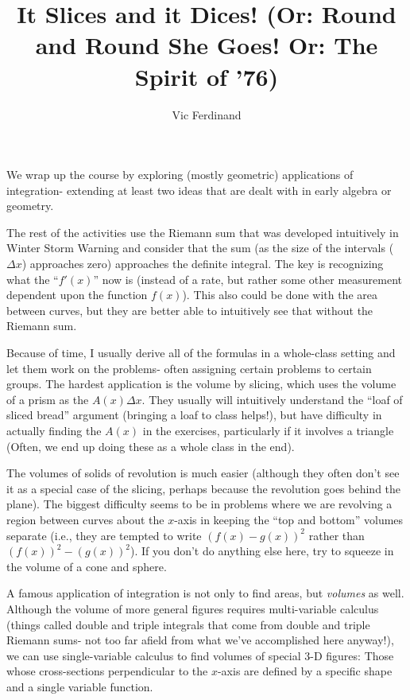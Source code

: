 \documentclass{ximera}
\author{Vic Ferdinand}
\title{It Slices and it Dices! (Or: Round and Round She Goes! Or: The Spirit of '76)}
\begin{document}
\begin{abstract}
\end{abstract}
\maketitle

\begin{instructorIntro}
We wrap up the course by exploring (mostly geometric) applications of integration- extending at least two ideas that are dealt with in early algebra or geometry.  

The rest of the activities use the Riemann sum that was developed intuitively in Winter Storm Warning and consider that the sum (as the size of the intervals ($\Delta x$) approaches zero) approaches the definite integral.  The key is recognizing what the ``$f'(x)$'' now is (instead of a rate, but rather some other measurement dependent upon the function $f(x)$).  This also could be done with the area between curves, but they are better able to intuitively see that without the Riemann sum. 

Because of time, I usually derive all of the formulas in a whole-class setting and let them work on the problems- often assigning certain problems to certain groups. The hardest application is the volume by slicing, which uses the volume of a prism as the $A(x) \Delta x$.  They usually will intuitively understand the ``loaf of sliced bread'' argument (bringing a loaf to class helps!), but have difficulty in actually finding the $A(x)$ in the exercises, particularly if it involves a triangle (Often, we end up doing these as a whole class in the end).

The volumes of solids of revolution is much easier (although they often don't see it as a special case of the slicing, perhaps because the revolution goes behind the plane).  The biggest difficulty seems to be in problems where we are revolving a region between curves about the $x$-axis in keeping the ``top and bottom'' volumes separate (i.e., they are tempted to write $(f(x)-g(x))^2$ rather than $(f(x))^2 - (g(x))^2$).  If you don't do anything else here, try to squeeze in the volume of a cone and sphere.

\end{instructorIntro}

A famous application of integration is not only to find areas, but {\em volumes} as well.  Although the volume of more general figures requires multi-variable calculus (things called double and triple integrals that come from double and triple Riemann sums- not too far afield from what we've accomplished here anyway!), we can use single-variable calculus to find volumes of special $3$-D figures:  Those whose cross-sections perpendicular to the $x$-axis are defined by a specific shape and a single variable function.
\end{document}

